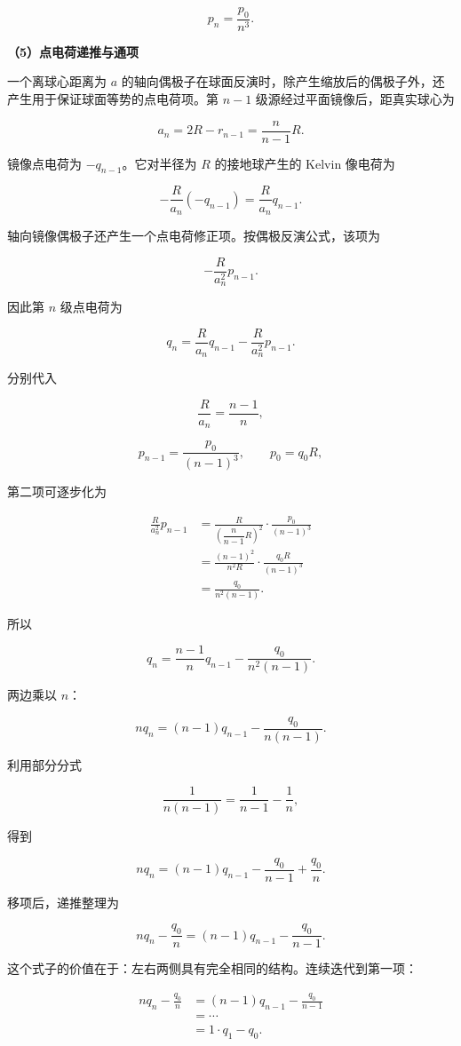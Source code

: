 \documentclass[12pt,a4paper,UTF8]{ctexart}
\begin{document}
\[\boxed{p_n=\frac{p_0}{n^3}}.\]

\textbf{（5）点电荷递推与通项}

一个离球心距离为 \(a\)
的轴向偶极子在球面反演时，除产生缩放后的偶极子外，还产生用于保证球面等势的点电荷项。第
\(n-1\) 级源经过平面镜像后，距真实球心为

\[a_n=2R-r_{n-1}
=\frac{n}{n-1}R.\]

镜像点电荷为 \(-q_{n-1}\)。它对半径为 \(R\) 的接地球产生的 Kelvin
像电荷为

\[-\frac{R}{a_n}(-q_{n-1})
=\frac{R}{a_n}q_{n-1}.\]

轴向镜像偶极子还产生一个点电荷修正项。按偶极反演公式，该项为

\[-\frac{R}{a_n^2}p_{n-1}.\]

因此第 \(n\) 级点电荷为

\[q_n
=\frac{R}{a_n}q_{n-1}
-\frac{R}{a_n^2}p_{n-1}.\]

分别代入

\[\frac{R}{a_n}=\frac{n-1}{n},\]

\[p_{n-1}=\frac{p_0}{(n-1)^3},\qquad
p_0=q_0R,\]

第二项可逐步化为

\[\begin{aligned}
\frac{R}{a_n^2}p_{n-1}
&=
\frac{R}{
\left(\dfrac{n}{n-1}R\right)^2
}
\cdot\frac{p_0}{(n-1)^3}\\
&=
\frac{(n-1)^2}{n^2R}
\cdot\frac{q_0R}{(n-1)^3}\\
&=\frac{q_0}{n^2(n-1)}.
\end{aligned}\]

所以

\[q_n
=\frac{n-1}{n}q_{n-1}
-\frac{q_0}{n^2(n-1)}.\]

两边乘以 \(n\)：

\[nq_n
=(n-1)q_{n-1}
-\frac{q_0}{n(n-1)}.\]

利用部分分式

\[\frac1{n(n-1)}
=\frac1{n-1}-\frac1n,\]

得到

\[nq_n
=(n-1)q_{n-1}
-\frac{q_0}{n-1}
+\frac{q_0}{n}.\]

移项后，递推整理为

\[nq_n-\frac{q_0}{n}
=(n-1)q_{n-1}-\frac{q_0}{n-1}.\]

这个式子的价值在于：左右两侧具有完全相同的结构。连续迭代到第一项：

\[\begin{aligned}
nq_n-\frac{q_0}{n}
&=(n-1)q_{n-1}-\frac{q_0}{n-1}\\
&=\cdots\\
&=1\cdot q_1-q_0.
\end{aligned}\]
\end{document}
